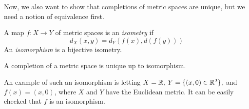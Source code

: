 Now, we also want to show that completions of metric spaces are unique, but we need a notion of equivalence first. 

\begin{definition}
	A map $f : X \to Y$ of metric spaces is an \emph{isometry} if
	\[ d_{X}(x, y) = d_{Y}(f(x), d(f(y))) \]
	An \emph{isomorphism} is a bijective isometry.
\end{definition}

\begin{theorem}
	A completion of a metric space is unique up to isomorphism.
\end{theorem}

An example of such an isomorphism is letting $X = \mathbb{R}$, $Y = \{(x, 0) \in \mathbb{R}^2\}$, and $f(x) = (x, 0)$, where $X$ and $Y$ have the Euclidean metric. It can be easily checked that $f$ is an isomorphism. 
\clearpage
